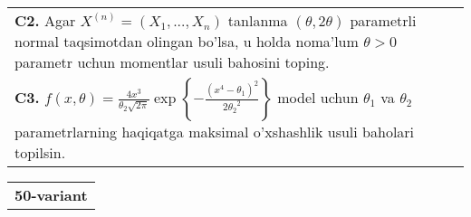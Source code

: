 \documentclass{article}
\begin{document}
\begin{tabular}{m{17cm}}
\\
\textbf{C2.} 
Agar \(X^{(n)} = \left( X_{1},...,X_{n} \right)\) tanlanma \((\theta,2\theta)\) parametrli normal taqsimotdan olingan bo'lsa, u holda noma'lum \(\theta > 0\) parametr uchun momentlar usuli bahosini toping.
\\
\textbf{C3.} 
\(f(x,\theta) = \frac{4x^{3}}{\theta_{2}\sqrt{2\pi}}\exp\left\{ - \frac{\left( x^{4} - \theta_{1} \right)^{2}}{2{\theta_{2}}^{2}} \right\}\) model uchun \(\theta_{1}\) va \(\theta_{2}\) parametrlarning haqiqatga maksimal o'xshashlik usuli baholari topilsin.
\\

\end{tabular}
\vspace{1cm}


\begin{tabular}{m{17cm}}
\textbf{50-variant}
\newline


\end{tabular}
\end{document}
